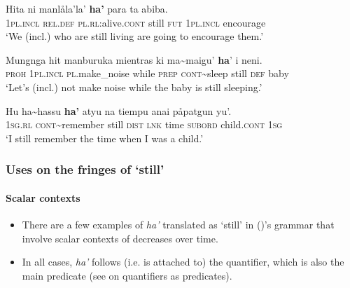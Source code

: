\begin{exe}
	\ex \label{exAppendixChamorro1}
	\gll Hita ni manlåla'la' \textbf{ha'} para ta abiba.\\
	1\textsc{pl}.\textsc{incl} \textsc{rel}.\textsc{def} \textsc{pl}.\textsc{rl}:alive.\textsc{cont} still \textsc{fut} 1\textsc{pl}.\textsc{incl} encourage\\
	\glt \lq We (incl.) who are still living are going to encourage them.\rq{ }\parencite[167–168]{Chung2020}

	\ex \label{exAppendixChamorro2}
	\gll Mungnga hit manburuka mientras ki ma\sim{}maigu' \textbf{ha}' i neni.\\
\textsc{proh} 1\textsc{pl}.\textsc{incl} \textsc{pl}.make\_noise while \textsc{prep} \textsc{cont}\sim{}sleep still \textsc{def} baby\\
	\glt \lq Let's (incl.) not make noise while the baby is still sleeping.\rq{ }\parencite[344]{Chung2020}
	
	\ex \label{exAppendixChamorro3}
	\gll Hu ha\sim{}hassu \textbf{ha'} atyu na tiempu anai påpatgun yu'.\\
	1\textsc{sg}.\textsc{rl} \textsc{cont}\sim{}remember still \textsc{dist} \textsc{lnk} time \textsc{subord} child.\textsc{cont} 1\textsc{sg}\\
	\glt \lq I still remember the time when I was a child.' \parencite[18]{Chung2020}
\end{exe}

\subsubsection{Uses on the fringes of \lq{}still\rq{}}
\paragraph{Scalar contexts}
\label{appendixChamorroScalar}
\begin{itemize}
	\item There are a few examples of \textit{ha'} translated as \lq still' in \citeauthor{Chung2020} (\citeyear{Chung2020})'s grammar that involve scalar contexts of decreases over time.
	\item In all cases, \textit{ha'} follows (i.e. is attached to) the quantifier, which is also the main predicate (see \cite[324–328]{Chung2020} on quantifiers as predicates).
\end{itemize}

